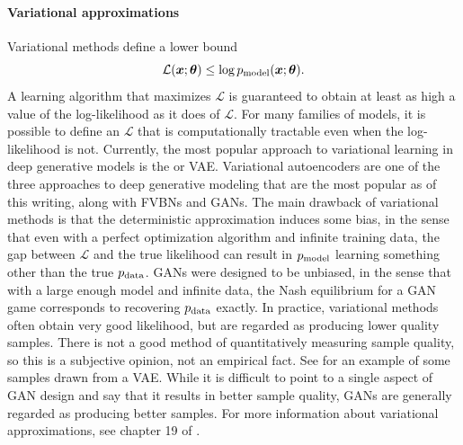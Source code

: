 \paragraph{Variational approximations}
Variational methods define a lower bound
\[ \mathcal{L}({\bm{x}}; {\bm{\theta}}) \leq \log p_{\rm{model}}({\bm{x}}; {\bm{\theta}}). \]
A learning algorithm that maximizes $\mathcal{L}$ is guaranteed to obtain at least
as high a value of the log-likelihood as it does of $\mathcal{L}$.
For many families of models, it is possible to define an $\mathcal{L}$ that is computationally
tractable even when the log-likelihood is not.
Currently, the most popular approach to variational learning in deep generative models
is the  \citep{Kingma-arxiv2013,Rezende-et-al-ICML2014} or VAE.
Variational autoencoders are one of the three approaches to deep generative modeling that are
the most popular as of this writing, along with FVBNs and GANs.
The main drawback of variational methods is that the deterministic approximation induces some bias,
in the sense that even with a perfect optimization algorithm and infinite training data, the gap
between $\mathcal{L}$ and the true likelihood can result in $p_{\rm{model}}$ learning something other than
the true $p_{\rm{data}}$.
GANs were designed to be unbiased, in the sense that with a large enough model and infinite data,
the Nash equilibrium for a GAN game corresponds to recovering $p_{\rm{data}}$ exactly.
In practice, variational methods often obtain very good likelihood, but are regarded as producing
lower quality samples.
There is not a good method of quantitatively measuring sample quality, so this is a subjective opinion,
not an empirical fact.
See  for an example of some samples drawn from a VAE.
While it is difficult to point to a single aspect of GAN design and say that it results in
better sample quality, GANs are generally regarded as producing better samples.
For more information about variational approximations, see chapter 19 of
\citet{Goodfellow-et-al-2016}.

